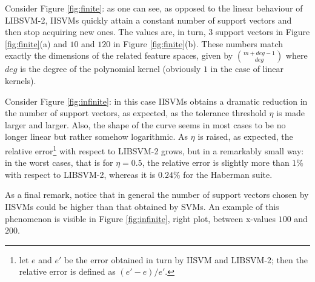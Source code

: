 

Consider Figure \ref{fig:finite}: as one can see, as opposed to the
linear behaviour of LIBSVM-2, IISVMs quickly attain a constant number
of support vectors and then stop acquiring new ones. The values are,
in turn, $3$ support vectors in Figure \ref{fig:finite}(a) and $10$
and $120$ in Figure \ref{fig:finite}(b). These numbers match exactly
the dimensions of the related feature spaces, given by
$\binom{m+deg-1}{deg}$ where $deg$ is the degree of the polynomial
kernel (obviously $1$ in the case of linear kernels).

Consider Figure \ref{fig:infinite}: in this case IISVMs obtains a
dramatic reduction in the number of support vectors, as expected, as
the tolerance threshold $\eta$ is made larger and larger. Also, the
shape of the curve seems in most cases to be no longer linear but
rather somehow logarithmic. As $\eta$ is raised, as expected, the
relative error\footnote{let $e$ and $e'$ be the error obtained
in turn by IISVM and LIBSVM-2; then the relative error is defined as
$(e'-e)/e'$.} with respect to LIBSVM-2 grows, but
in a remarkably small way: in the worst cases, that is for $\eta=0.5$,
the relative error is slightly more than $1\%$ with respect to
LIBSVM-2, whereas it is $0.24\%$ for the Haberman suite.

As a final remark, notice that in general the number of support
vectors chosen by IISVMs could be higher than that obtained by
SVMs. An example of this phenomenon is visible in Figure
\ref{fig:infinite}, right plot, between x-values $100$ and $200$.
